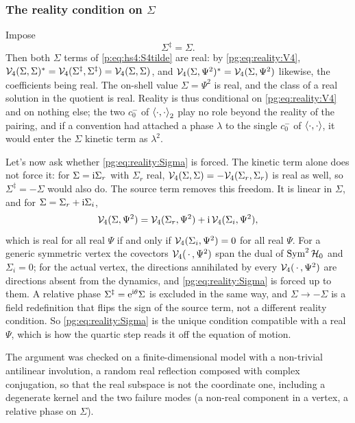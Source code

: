 \subsubsection{The reality condition on \texorpdfstring{$\Sigma$}{Sigma}}
\label{pg:sec:reality:condition}

Impose
\begin{equation}
  \label{pg:eq:reality:Sigma}
  \boxed{\;
  \Sigma^\ddagger = \Sigma .
  \;}
\end{equation}
Then both $\Sigma$ terms of \eqref{p:eq:hs4:S4tilde} are real: by \eqref{pg:eq:reality:V4}, ${\mathcal{V}}_4(\Sigma,\Sigma)^*={\mathcal{V}}_4(\Sigma^\ddagger,\Sigma^\ddagger)={\mathcal{V}}_4(\Sigma,\Sigma)$, and ${\mathcal{V}}_4(\Sigma,\Psi^2)^*={\mathcal{V}}_4(\Sigma,\Psi^2)$ likewise, the coefficients being real.
The on-shell value $\Sigma=\Psi^2$ is real, and the class of a real solution in the quotient is real.
Reality is thus conditional on \eqref{pg:eq:reality:V4} and on nothing else; the two $c_0^-$ of $\braket{\cdot,\cdot}_2$ play no role beyond the reality of the pairing, and if a convention had attached a phase $\lambda$ to the single $c_0^-$ of $\braket{\cdot,\cdot}$, it would enter the $\Sigma$ kinetic term as $\lambda^2$.

Let's now ask whether \eqref{pg:eq:reality:Sigma} is forced.
The kinetic term alone does not force it: for $\Sigma=\mathrm{i}\Sigma_r$ with $\Sigma_r$ real, ${\mathcal{V}}_4(\Sigma,\Sigma)=-{\mathcal{V}}_4(\Sigma_r,\Sigma_r)$ is real as well, so $\Sigma^\ddagger=-\Sigma$ would also do.
The source term removes this freedom.
It is linear in $\Sigma$, and for $\Sigma=\Sigma_r+\mathrm{i}\Sigma_i$,
\begin{equation}
  {\mathcal{V}}_4(\Sigma, \Psi^2)
    = {\mathcal{V}}_4(\Sigma_r, \Psi^2)
      + \mathrm{i} \, {\mathcal{V}}_4(\Sigma_i, \Psi^2),
\end{equation}
which is real for all real $\Psi$ if and only if ${\mathcal{V}}_4(\Sigma_i,\Psi^2)=0$ for all real $\Psi$.
For a generic symmetric vertex the covectors ${\mathcal{V}}_4(\,\cdot\,,\Psi^2)$ span the dual of $\operatorname{Sym}^2{\mathcal{H}}_0$ and $\Sigma_i=0$; for the actual vertex, the directions annihilated by every ${\mathcal{V}}_4(\,\cdot\,,\Psi^2)$ are directions absent from the dynamics, and \eqref{pg:eq:reality:Sigma} is forced up to them.
A relative phase $\Sigma^\ddagger=\mathrm{e}^{\mathrm{i}\theta}\Sigma$ is excluded in the same way, and $\Sigma\to-\Sigma$ is a field redefinition that flips the sign of the source term, not a different reality condition.
So \eqref{pg:eq:reality:Sigma} is the unique condition compatible with a real $\Psi$, which is how the quartic step reads it off the equation of motion.

The argument was checked on a finite-dimensional model with a non-trivial antilinear involution, a random real reflection composed with complex conjugation, so that the real subspace is not the coordinate one, including a degenerate kernel and the two failure modes (a non-real component in a vertex, a relative phase on $\Sigma$).

